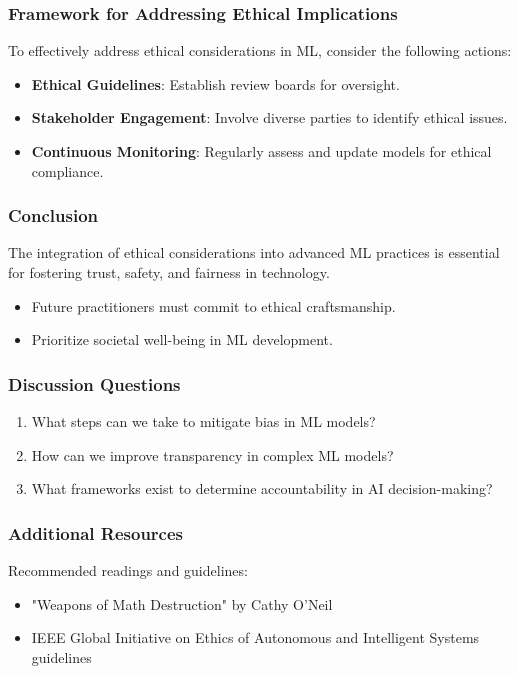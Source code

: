 \documentclass[aspectratio=169]{beamer}
\begin{document}
\begin{frame}[fragile]
    \frametitle{Framework for Addressing Ethical Implications}
    To effectively address ethical considerations in ML, consider the following actions:
    \begin{itemize}
        \item \textbf{Ethical Guidelines}: Establish review boards for oversight.
        \item \textbf{Stakeholder Engagement}: Involve diverse parties to identify ethical issues.
        \item \textbf{Continuous Monitoring}: Regularly assess and update models for ethical compliance.
    \end{itemize}
\end{frame}

\begin{frame}[fragile]
    \frametitle{Conclusion}
    The integration of ethical considerations into advanced ML practices is essential for fostering trust, safety, and fairness in technology. 
    \begin{itemize}
        \item Future practitioners must commit to ethical craftsmanship.
        \item Prioritize societal well-being in ML development.
    \end{itemize}
\end{frame}

\begin{frame}[fragile]
    \frametitle{Discussion Questions}
    \begin{enumerate}
        \item What steps can we take to mitigate bias in ML models?
        \item How can we improve transparency in complex ML models?
        \item What frameworks exist to determine accountability in AI decision-making?
    \end{enumerate}
\end{frame}

\begin{frame}[fragile]
    \frametitle{Additional Resources}
    Recommended readings and guidelines:
    \begin{itemize}
        \item "Weapons of Math Destruction" by Cathy O'Neil
        \item IEEE Global Initiative on Ethics of Autonomous and Intelligent Systems guidelines
    \end{itemize}
\end{frame}
\end{document}
